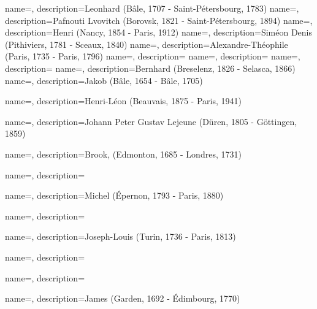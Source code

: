  {
    name=,
    description={Leonhard (Bâle, 1707 -  Saint-Pétersbourg, 1783)}
    }
%
 {
    name=,
    description={Pafnouti Lvovitch (Borovsk, 1821 - Saint-Pétersbourg, 1894)}
    }
%   
 {
    name=,
    description={Henri (Nancy, 1854 - Paris, 1912)}
}
 {
    name=,
    description={Siméon Denis (Pithiviers, 1781 - Sceaux, 1840)}
}
%    
 {
    name=,
    description={Alexandre-Théophile (Paris, 1735 - Paris, 1796)}
    }
%    
 {
    name=,
    description={}
    }
%
 {
    name=,
    description={}
    }
%    
 {
    name=,
    description={}
    }
%   
 {
    name=,
    description={Bernhard (Breselenz, 1826 - Selasca, 1866)}
    }
%
 {
    name=,
    description={Jakob (Bâle, 1654 - Bâle, 1705)}
    }
    
 {
    name=,
    description={Henri-Léon (Beauvais, 1875 - Paris, 1941)}
    }
    
 {
    name=,
    description={Johann Peter Gustav Lejeune (Düren, 1805 - Göttingen, 1859)}
    }
    
 {
    name=,
    description={Brook, (Edmonton, 1685 - Londres, 1731)}
}

 {
    name=,
    description={}
    }
    
 {
    name=,
    description={Michel (Épernon, 1793 - Paris, 1880)}
    }
    
 {
    name=,
    description={}
    }
    
 {
    name=,
    description={Joseph-Louis (Turin, 1736 - Paris, 1813)}
    }
    
 {
    name=,
    description={}
    }
    
 {
    name=,
    description={}
    }
    
 {
    name=,
    description={James (Garden, 1692 - Édimbourg, 1770)}
    }
    
